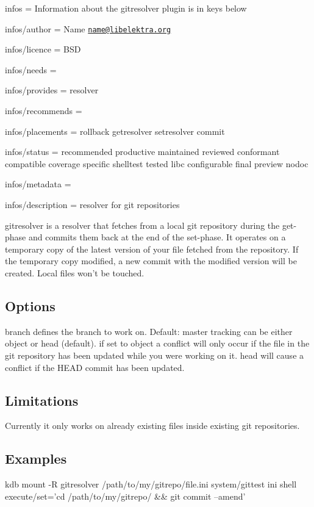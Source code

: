 
\begin{DoxyItemize}
\item infos = Information about the gitresolver plugin is in keys below
\item infos/author = Name \href{mailto:name@libelektra.org}{\tt name@libelektra.\+org}
\item infos/licence = B\+S\+D
\item infos/needs =
\item infos/provides = resolver
\item infos/recommends =
\item infos/placements = rollback getresolver setresolver commit
\item infos/status = recommended productive maintained reviewed conformant compatible coverage specific shelltest tested libc configurable final preview nodoc
\item infos/metadata =
\item infos/description = resolver for git repositories
\end{DoxyItemize}

gitresolver is a resolver that fetches from a local git repository during the get-\/phase and commits them back at the end of the set-\/phase. It operates on a temporary copy of the latest version of your file fetched from the repository. If the temporary copy modified, a new commit with the modified version will be created. Local files won't be touched.

\subsection*{Options}

{\ttfamily branch} defines the branch to work on. Default\+: master {\ttfamily tracking} can be either {\ttfamily object} or {\ttfamily head} (default). if set to {\ttfamily object} a conflict will only occur if the file in the git repository has been updated while you were working on it. {\ttfamily head} will cause a conflict if the {\ttfamily H\+E\+A\+D} commit has been updated.

\subsection*{Limitations}

Currently it only works on already existing files inside existing git repositories.

\subsection*{Examples}

\begin{DoxyVerb}kdb mount -R gitresolver /path/to/my/gitrepo/file.ini system/gittest ini shell execute/set='cd /path/to/my/gitrepo/ && git commit --amend'\end{DoxyVerb}
 